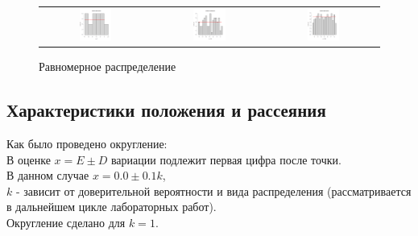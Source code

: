 \documentclass[a4paper,14pt]{article}
\begin{document}
	\begin{figure}[H]
		\centering
		\begin{tabular}{c c c}
			\includegraphics[height = 0.25\textheight, width = 0.31\textwidth]{./lab1_1/pictures/ n = 10 uniform distribution.png}
			& \includegraphics[height = 0.25\textheight, width = 0.31\textwidth]{./lab1_1/pictures/ n = 100 uniform distribution.png}
			& \includegraphics[height = 0.25\textheight, width = 0.31\textwidth]{./lab1_1/pictures/ n = 1000 uniform distribution.png}
		\end{tabular}
		\caption{Равномерное распределение}
	\end{figure}
	\subsection{Характеристики положения и рассеяния}
	Как было проведено округление:\\
	В оценке $x=E  \pm D$ вариации подлежит первая цифра после точки. \\
	В данном случае $x=0.0 \pm 0.1k$,\\
	$k$ - зависит от доверительной вероятности и вида распределения (рассматривается в дальнейшем цикле лабораторных работ). \\
	Округление сделано для  $k=1$.
	
\end{document}
